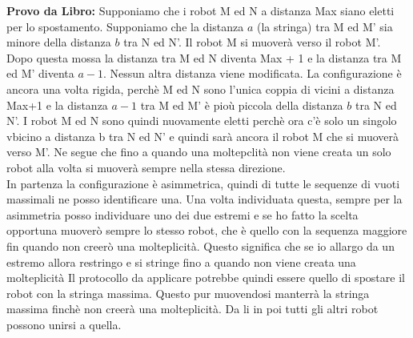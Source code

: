 \textbf{Provo da Libro:} Supponiamo che i robot M ed N a distanza Max siano eletti per lo spostamento. Supponiamo che la distanza $a$ (la stringa) tra M ed M' sia minore della distanza $b$ tra N ed N'. Il robot M si muoverà verso il robot M'. Dopo questa mossa la distanza tra M ed N diventa Max + 1 e la distanza tra M ed M' diventa $a-1$. Nessun altra distanza viene modificata. La configurazione è ancora una volta rigida, perchè M ed N sono l'unica coppia di vicini a distanza Max+1 e la distanza $a-1$ tra M ed M' è pioù piccola della distanza $b$ tra N ed N'. I robot M ed N sono quindi nuovamente eletti perchè ora c'è solo un singolo vbicino a distanza b tra N ed N' e quindi sarà ancora il robot M che si muoverà verso M'. Ne segue che fino a quando una moltepclità non viene creata un solo robot alla volta si muoverà sempre nella stessa direzione.\\
In partenza la configurazione è asimmetrica, quindi di tutte le sequenze di vuoti massimali ne posso identificare una. Una volta individuata questa, sempre per la asimmetria posso individuare uno dei due estremi e se ho fatto la scelta opportuna muoverò sempre lo stesso robot, che è quello con la sequenza maggiore fin quando non creerò una molteplicità. Questo significa che se io allargo da un estremo allora restringo e si stringe fino a quando non viene creata una molteplicità Il protocollo da applicare potrebbe quindi essere quello di spostare il robot con la stringa massima. Questo pur muovendosi manterrà la stringa massima finchè non creerà una molteplicità. Da li in poi tutti gli altri robot possono unirsi a quella.

